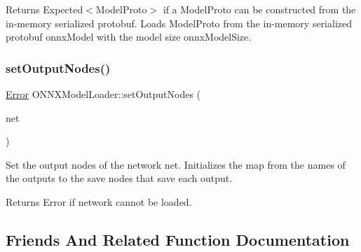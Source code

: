 \begin{DoxyReturn}{Returns}
Expected$<$\+Model\+Proto$>$ if a Model\+Proto can be constructed from the in-\/memory serialized protobuf. Loads Model\+Proto from the in-\/memory serialized protobuf {\ttfamily onnx\+Model} with the model size {\ttfamily onnx\+Model\+Size}. 
\end{DoxyReturn}
\mbox{\label{classglow_1_1_o_n_n_x_model_loader_ad27874fc7944a1514d1c0366edf432cf}} 
\subsubsection{\texorpdfstring{set\+Output\+Nodes()}{setOutputNodes()}}
{\footnotesize\ttfamily \hyperlink{namespaceglow_afdb176c3a672ef66db0ecfc19a8d39bf}{Error} O\+N\+N\+X\+Model\+Loader\+::set\+Output\+Nodes (\begin{DoxyParamCaption}\item[{O\+N\+N\+X\+\_\+\+N\+A\+M\+E\+S\+P\+A\+C\+E\+::\+Graph\+Proto \&}]{net }\end{DoxyParamCaption})\hspace{0.3cm}{\ttfamily [protected]}}

Set the output nodes of the network {\ttfamily net}. Initializes the map from the names of the outputs to the save nodes that save each output. \begin{DoxyReturn}{Returns}
Error if network cannot be loaded. 
\end{DoxyReturn}


\subsection{Friends And Related Function Documentation}
\mbox{\label{classglow_1_1_o_n_n_x_model_loader_a80921ed3db9c22615413812ec08923de}} 
